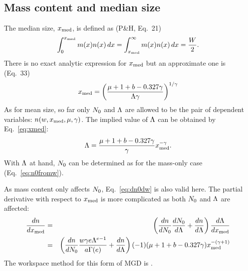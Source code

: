 \subsection{Mass content and median size}
%
The median size, $x_\mathrm{med}$, is defined as (P\&H, Eq.~21)
\begin{equation}
  \int_0^{x_\mathrm{med}} m(x) n(x)\, dx= \int_{x_\mathrm{med}}^\infty m(x) n(x)\, dx= \frac{W}{2}.
\end{equation}
There is no exact analytic expression for $x_\mathrm{med}$ but an approximate one is (Eq.~33)
\begin{equation}
  x_\mathrm{med} = \left( \frac{\mu+1+b-0.327\gamma}{\Lambda\gamma} \right)^{1/\gamma}
  \label{eq:xmed}
\end{equation}
As for mean size, so far only $N_0$ and $\Lambda$ are allowed to be the pair of
dependent variables: $n(w,x_\mathrm{med},\mu,\gamma)$. The implied value of $\Lambda$ can be
obtained by Eq.~\ref{eq:xmed}:
\begin{equation}
  \Lambda = \frac{\mu+1+b-0.327\gamma}{\gamma}x_\mathrm{med}^{-\gamma}. 
\end{equation}
With $\Lambda$ at hand, $N_0$ can be determined as for the mass-only case
(Eq.~\ref{eq:n0fromw}).

As mass content only affects $N_0$, Eq.~\ref{eq:dn0dw} is also valid here. The
partial derivative with respect to $x_\mathrm{med}$ is more complicated as both $N_0$
and $\Lambda$ are affected:
\begin{eqnarray}
  \frac{dn}{dx_\mathrm{med}} &=& \left( \frac{dn}{dN_0}\frac{dN_0}{d\Lambda} + 
                        \frac{dn}{d\Lambda} \right) \frac{d\Lambda}{dx_\mathrm{med}} \nonumber\\
 &=& \left( \frac{dn}{dN_0} \frac{w\gamma e\Lambda^{e-1}}{a\Gamma(e)} + 
                        \frac{dn}{d\Lambda} \right) (-1)(\mu+1+b-0.327\gamma)x_\mathrm{med}^{-(\gamma+1)} 
\end{eqnarray}
The workspace method for this form of MGD is .



